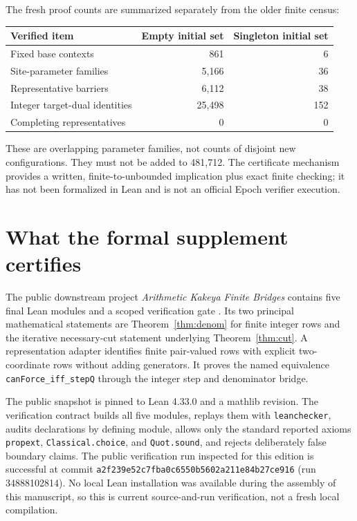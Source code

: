 \documentclass[11pt,letterpaper]{article}
\theoremstyle{definition}
\theoremstyle{remark}\newtheorem{remark}[theorem]{Remark}
\begin{document}
The fresh proof counts are summarized separately from the older finite census:
\begin{center}\small
\begin{tabular}{p{}rr}\toprule
Verified item&Empty initial set&Singleton initial set\\\midrule
Fixed base contexts&861&6\\
Site-parameter families&5,166&36\\
Representative barriers&6,112&38\\
Integer target-dual identities&25,498&152\\
Completing representatives&0&0\\\bottomrule
\end{tabular}
\end{center}
These are overlapping parameter families, not counts of disjoint new configurations. They must not be added to 481,712. The certificate mechanism provides a written, finite-to-unbounded implication plus exact finite checking; it has not been formalized in Lean and is not an official Epoch verifier execution.

\section{What the formal supplement certifies}\label{sec:formal}
The public downstream project \emph{Arithmetic Kakeya Finite Bridges} contains five final Lean modules and a scoped verification gate \cite{BeasleyLean}. Its two principal mathematical statements are Theorem~\ref{thm:denom} for finite integer rows and the iterative necessary-cut statement underlying Theorem~\ref{thm:cut}. A representation adapter identifies finite pair-valued rows with explicit two-coordinate rows without adding generators. It proves the named equivalence \texttt{canForce\_iff\_stepQ} through the integer step and denominator bridge.

The public snapshot is pinned to Lean 4.33.0 and a mathlib revision. The verification contract builds all five modules, replays them with \texttt{leanchecker}, audits declarations by defining module, allows only the standard reported axioms \texttt{propext}, \texttt{Classical.choice}, and \texttt{Quot.sound}, and rejects deliberately false boundary claims. The public verification run inspected for this edition is successful at commit \nolinkurl{a2f239e52c7fba0c6550b5602a211e84b27ce916} (run 34888102814). No local Lean installation was available during the assembly of this manuscript, so this is current source-and-run verification, not a fresh local compilation.
\end{document}
